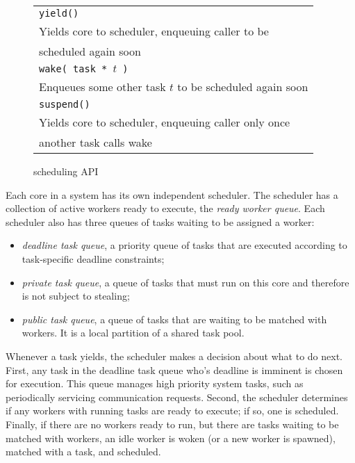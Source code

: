 \begin{figure}[htbp]
  \begin{center}
	\begin{tabular}{l}
    \texttt{\scriptsize yield() } \\
      Yields core to scheduler, enqueuing caller to be \\ scheduled again soon \\
    \texttt{\scriptsize wake( task * $t$ ) } \\
      Enqueues some other task $t$ to be scheduled again soon \\
    \texttt{\scriptsize suspend() }  \\
      Yields core to scheduler, enqueuing caller only once \\ another task calls wake \\
	\end{tabular}
    \begin{minipage}{0.95\columnwidth}
      \caption{\label{fig:scheduling} \Grappa scheduling API } 
    \end{minipage}
  \end{center}
\end{figure}

Each core in a \Grappa system has its own independent scheduler. The scheduler
has a collection of active workers ready to execute, the {\it
ready worker queue}. Each scheduler also has three queues of tasks
waiting to be assigned a worker:

\begin{itemize}

\item {\it deadline task queue}, a priority queue of tasks that are executed according to task-specific deadline constraints;

\item {\it private task queue}, a queue of tasks that must run on
this core and therefore is not subject to stealing;

\item {\it public task queue}, a queue of tasks that are
  waiting to be matched with workers. It is a local partition of a shared
  task pool.

\end{itemize}


Whenever a task yields, the scheduler makes a decision about what
to do next. First, any task in the deadline task queue who's deadline
is imminent is chosen for execution. This queue manages high priority
system tasks, such as periodically servicing communication requests. Second,
the scheduler determines if any workers with running tasks are ready to
execute; if so, one is scheduled. Finally, if there are no workers ready to
run, but there are tasks waiting to be matched with workers, an idle worker is
woken (or a new worker is spawned), matched with a task, and scheduled.

